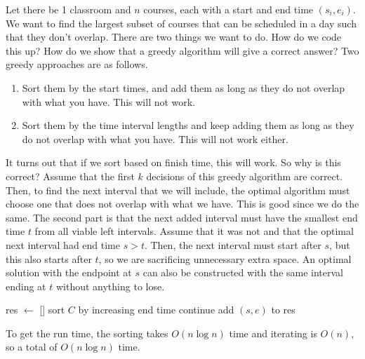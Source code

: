 \documentclass{article}
\begin{document}
  \begin{example}
    Let there be 1 classroom and $n$ courses, each with a start and end time $(s_i, e_i)$. We want to find the largest subset of courses that can be scheduled in a day such that they don't overlap. There are two things we want to do. How do we code this up? How do we show that a greedy algorithm will give a correct answer? Two greedy approaches are as follows. 
    \begin{enumerate}
      \item Sort them by the start times, and add them as long as they do not overlap with what you have. This will not work. 
      \item Sort them by the time interval lengths and keep adding them as long as they do not overlap with what you have. This will not work either. 
    \end{enumerate}
    It turns out that if we sort based on finish time, this will work. So why is this correct? Assume that the first $k$ decisions of this greedy algorithm are correct. Then, to find the next interval that we will include, the optimal algorithm must choose one that does not overlap with what we have. This is good since we do the same. The second part is that the next added interval must have the smallest end time $t$ from all viable left intervals. Assume that it was not and that the optimal next interval had end time $s > t$. Then, the next interval must start after $s$, but this also starts after $t$, so we are sacrificing unnecessary extra space. An optimal solution with the endpoint at $s$ can also be constructed with the same interval ending at $t$ without anything to lose. 

    \begin{algorithm}[H]
      \label{alg:class1}
      \begin{algorithmic}
        \State 
          \State res $\gets$ []
          \State sort $C$ by increasing end time
             
              \State continue
            \EndIf
            \State add $(s, e)$ to res
          \EndFor
          \State {}
        \EndFunction
      \end{algorithmic}
    \end{algorithm}
    To get the run time, the sorting takes $O(n \log{n})$ time and iterating is $O(n)$, so a total of $O(n \log{n})$ time. 
  \end{example}
\end{document}
